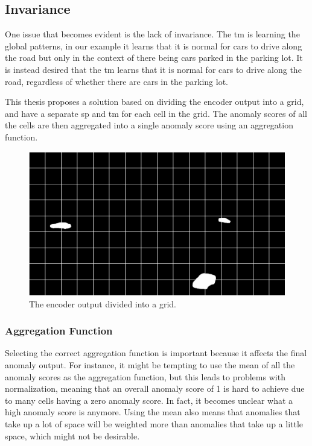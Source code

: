 \subsection{Invariance}
One issue that becomes evident is the lack of invariance. The \gls*{tm} is learning the global patterns, in our example it learns that it is normal for cars to drive along the road but only in the context of there being cars parked in the parking lot. It is instead desired that the \gls*{tm} learns that it is normal for cars to drive along the road, regardless of whether there are cars in the parking lot.
\par
This thesis proposes a solution based on dividing the encoder output into a grid, and have a separate \gls*{sp} and \gls*{tm} for each cell in the grid. The anomaly scores of all the cells are then aggregated into a single anomaly score using an aggregation function.
\begin{figure}[H]
    \centering
    \includegraphics[width=\textwidth]{resources/methodology/car_segmentation_grid.png}
    \caption{The encoder output divided into a grid.}
    \label{fig:grid}
\end{figure}
\subsubsection{Aggregation Function}
Selecting the correct aggregation function is important because it affects the final anomaly output. For instance, it might be tempting to use the mean of all the anomaly scores as the aggregation function, but this leads to problems with normalization, meaning that an overall anomaly score of 1 is hard to achieve due to many cells having a zero anomaly score. In fact, it becomes unclear what a high anomaly score is anymore. Using the mean also means that anomalies that take up a lot of space will be weighted more than anomalies that take up a little space, which might not be desirable.

